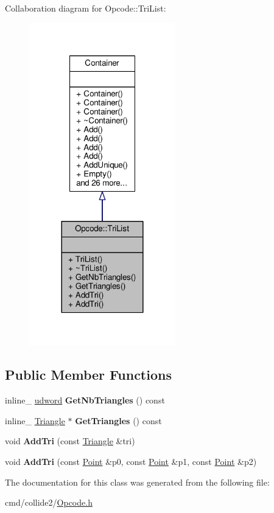 Collaboration diagram for Opcode\+:\+:Tri\+List\+:
\nopagebreak
\begin{figure}[H]
\begin{center}
\leavevmode
\includegraphics[width=180pt]{d3/d46/classOpcode_1_1TriList__coll__graph}
\end{center}
\end{figure}
\subsection*{Public Member Functions}
\begin{DoxyCompactItemize}
\item 
inline\+\_\+ \hyperlink{IceTypes_8h_a44c6f1920ba5551225fb534f9d1a1733}{udword} {\bfseries Get\+Nb\+Triangles} () const \hypertarget{classOpcode_1_1TriList_a9f7a3113c062c42c6d30f0dc22c1af2f}{}\label{classOpcode_1_1TriList_a9f7a3113c062c42c6d30f0dc22c1af2f}

\item 
inline\+\_\+ \hyperlink{classOpcode_1_1Triangle}{Triangle} $\ast$ {\bfseries Get\+Triangles} () const \hypertarget{classOpcode_1_1TriList_a9b0ef53c4472f0306006b39fcbb77615}{}\label{classOpcode_1_1TriList_a9b0ef53c4472f0306006b39fcbb77615}

\item 
void {\bfseries Add\+Tri} (const \hyperlink{classOpcode_1_1Triangle}{Triangle} \&tri)\hypertarget{classOpcode_1_1TriList_a8a05ce6e5d5a7489f4539e1ea00aa4c3}{}\label{classOpcode_1_1TriList_a8a05ce6e5d5a7489f4539e1ea00aa4c3}

\item 
void {\bfseries Add\+Tri} (const \hyperlink{classOpcode_1_1Point}{Point} \&p0, const \hyperlink{classOpcode_1_1Point}{Point} \&p1, const \hyperlink{classOpcode_1_1Point}{Point} \&p2)\hypertarget{classOpcode_1_1TriList_a2a34ed4961c46f4b85775d66e9f602bf}{}\label{classOpcode_1_1TriList_a2a34ed4961c46f4b85775d66e9f602bf}

\end{DoxyCompactItemize}


The documentation for this class was generated from the following file\+:\begin{DoxyCompactItemize}
\item 
cmd/collide2/\hyperlink{Opcode_8h}{Opcode.\+h}\end{DoxyCompactItemize}
